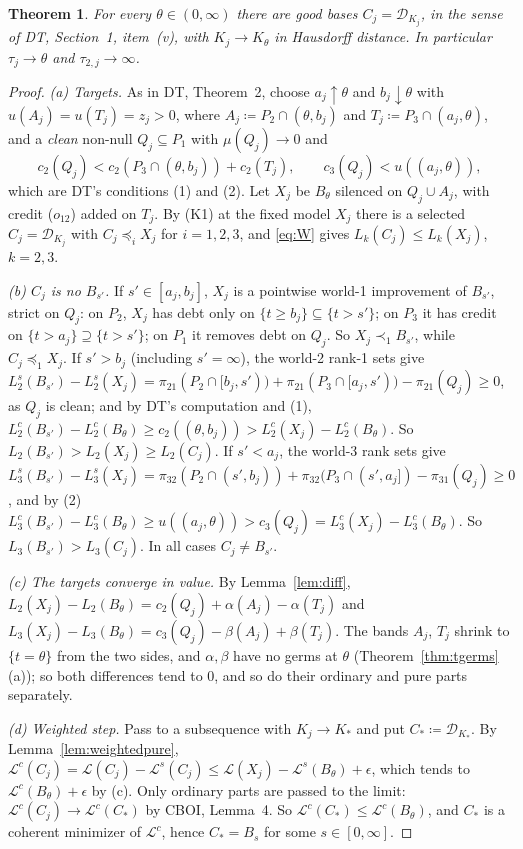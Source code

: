 \documentclass[11pt]{article}
\newtheorem{theorem}{Theorem}
\theoremstyle{definition}\newtheorem{definition}[theorem]{Definition}
\theoremstyle{remark}\newtheorem{remark}[theorem]{Remark}
\newcommand{\Dscr}{\mathcal D}
\begin{document}
\begin{theorem}\label{thm:densefa}
For every $\theta\in(0,\infty)$ there are good bases $C_j=\Dscr_{K_j}$, in
the sense of DT, Section~1, item~(v), with $K_j\to K_\theta$ in Hausdorff
distance. In particular $\tau_j\to\theta$ and $\tau_{2,j}\to\infty$.
\end{theorem}
\begin{proof}
\emph{(a) Targets.} As in DT, Theorem~2, choose $a_j\uparrow\theta$ and
$b_j\downarrow\theta$ with $u(A_j)=u(T_j)=z_j>0$, where $A_j\coloneqq
P_2\cap(\theta,b_j)$ and $T_j\coloneqq P_3\cap(a_j,\theta)$, and a
\emph{clean} non-null $Q_j\subseteq P_1$ with $\mu(Q_j)\to0$ and
\[
 c_2(Q_j)<c_2(P_3\cap(\theta,b_j))+c_2(T_j),\qquad
 c_3(Q_j)<u((a_j,\theta)),
\]
which are DT's conditions (1) and (2). Let $X_j$ be $B_\theta$ silenced on
$Q_j\cup A_j$, with credit ($o_{12}$) added on $T_j$. By (K1) at the fixed
model $X_j$ there is a selected $C_j=\Dscr_{K_j}$ with $C_j\preceq_iX_j$ for
$i=1,2,3$, and \eqref{eq:W} gives $L_k(C_j)\le L_k(X_j)$, $k=2,3$.

\emph{(b) $C_j$ is no $B_{s'}$.} If $s'\in[a_j,b_j]$, $X_j$ is a pointwise
world-1 improvement of $B_{s'}$, strict on $Q_j$: on $P_2$, $X_j$ has debt
only on $\{t\ge b_j\}\subseteq\{t>s'\}$; on $P_3$ it has credit on
$\{t>a_j\}\supseteq\{t>s'\}$; on $P_1$ it removes debt on $Q_j$. So
$X_j\prec_1B_{s'}$, while $C_j\preceq_1X_j$. If $s'>b_j$ (including
$s'=\infty$), the world-2 rank-1 sets give
$L_2^s(B_{s'})-L_2^s(X_j)=\pi_{21}(P_2\cap[b_j,s'))+\pi_{21}(P_3\cap[a_j,s'))
-\pi_{21}(Q_j)\ge0$, as $Q_j$ is clean; and by DT's computation and (1),
$L_2^c(B_{s'})-L_2^c(B_\theta)\ge c_2((\theta,b_j))>L_2^c(X_j)-
L_2^c(B_\theta)$. So $L_2(B_{s'})>L_2(X_j)\ge L_2(C_j)$. If $s'<a_j$, the
world-3 rank sets give $L_3^s(B_{s'})-L_3^s(X_j)=\pi_{32}(P_2\cap(s',b_j))
+\pi_{32}(P_3\cap(s',a_j])-\pi_{31}(Q_j)\ge0$, and by (2)
$L_3^c(B_{s'})-L_3^c(B_\theta)\ge u((a_j,\theta))>c_3(Q_j)=L_3^c(X_j)-
L_3^c(B_\theta)$. So $L_3(B_{s'})>L_3(C_j)$. In all cases $C_j\ne B_{s'}$.

\emph{(c) The targets converge in value.} By Lemma~\ref{lem:diff},
$L_2(X_j)-L_2(B_\theta)=c_2(Q_j)+\alpha(A_j)-\alpha(T_j)$ and
$L_3(X_j)-L_3(B_\theta)=c_3(Q_j)-\beta(A_j)+\beta(T_j)$. The bands $A_j$,
$T_j$ shrink to $\{t=\theta\}$ from the two sides, and $\alpha,\beta$ have no
germs at $\theta$ (Theorem~\ref{thm:tgerms}(a)); so both differences tend to
$0$, and so do their ordinary and pure parts separately.

\emph{(d) Weighted step.} Pass to a subsequence with $K_j\to K_*$ and put
$C_*\coloneqq\Dscr_{K_*}$. By Lemma~\ref{lem:weightedpure},
$\mathcal L^c(C_j)=\mathcal L(C_j)-\mathcal L^s(C_j)\le \mathcal L(X_j)-\mathcal L^s(B_\theta)+\epsilon$, which tends to
$\mathcal L^c(B_\theta)+\epsilon$ by (c). Only ordinary parts are passed to the limit:
$\mathcal L^c(C_j)\to \mathcal L^c(C_*)$ by CBOI, Lemma~4. So $\mathcal L^c(C_*)\le \mathcal L^c(B_\theta)$, and
$C_*$ is a coherent minimizer of $\mathcal L^c$, hence $C_*=B_s$ for some
$s\in[0,\infty]$.


\end{proof}
\end{document}
